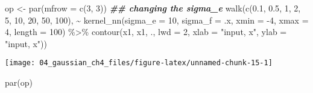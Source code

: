 \documentclass[
]{article}
\newenvironment{Shaded}{\begin{snugshade}}{\end{snugshade}}
\newcommand{\AttributeTok}[1]{\textcolor[rgb]{0.77,0.63,0.00}{#1}}
\newcommand{\DecValTok}[1]{\textcolor[rgb]{0.00,0.00,0.81}{#1}}
\newcommand{\DocumentationTok}[1]{\textcolor[rgb]{0.56,0.35,0.01}{\textbf{\textit{#1}}}}
\newcommand{\FloatTok}[1]{\textcolor[rgb]{0.00,0.00,0.81}{#1}}
\newcommand{\FunctionTok}[1]{\textcolor[rgb]{0.00,0.00,0.00}{#1}}
\newcommand{\NormalTok}[1]{#1}
\newcommand{\OtherTok}[1]{\textcolor[rgb]{0.56,0.35,0.01}{#1}}
\newcommand{\SpecialCharTok}[1]{\textcolor[rgb]{0.00,0.00,0.00}{#1}}
\newcommand{\StringTok}[1]{\textcolor[rgb]{0.31,0.60,0.02}{#1}}
\begin{document}
\begin{Shaded}
\begin{Highlighting}[]
\NormalTok{op }\OtherTok{\textless{}{-}} \FunctionTok{par}\NormalTok{(}\AttributeTok{mfrow =} \FunctionTok{c}\NormalTok{(}\DecValTok{3}\NormalTok{, }\DecValTok{3}\NormalTok{))}
\DocumentationTok{\#\# changing the sigma\_e}
\FunctionTok{walk}\NormalTok{(}\FunctionTok{c}\NormalTok{(}\FloatTok{0.1}\NormalTok{, }\FloatTok{0.5}\NormalTok{, }\DecValTok{1}\NormalTok{, }
      \DecValTok{2}\NormalTok{, }\DecValTok{5}\NormalTok{, }\DecValTok{10}\NormalTok{, }
      \DecValTok{20}\NormalTok{, }\DecValTok{50}\NormalTok{, }\DecValTok{100}\NormalTok{),}
    \SpecialCharTok{\textasciitilde{}} \FunctionTok{kernel\_nn}\NormalTok{(}\AttributeTok{sigma\_e =} \DecValTok{10}\NormalTok{,}
                \AttributeTok{sigma\_f =}\NormalTok{ .x,}
                \AttributeTok{xmin =} \SpecialCharTok{{-}}\DecValTok{4}\NormalTok{,}
                \AttributeTok{xmax =} \DecValTok{4}\NormalTok{,}
                \AttributeTok{length =} \DecValTok{100}\NormalTok{) }\SpecialCharTok{\%\textgreater{}\%}
      \FunctionTok{contour}\NormalTok{(x1, x1, .,}
              \AttributeTok{lwd =} \DecValTok{2}\NormalTok{,}
              \AttributeTok{xlab =} \StringTok{"input, x"}\NormalTok{,}
              \AttributeTok{ylab =} \StringTok{"input, x\textquotesingle{}"}\NormalTok{))}
\end{Highlighting}
\end{Shaded}

\begin{center}\texttt{[image: 04\_gaussian\_ch4\_files/figure-latex/unnamed-chunk-15-1]} \end{center}

\begin{Shaded}
\begin{Highlighting}[]
\FunctionTok{par}\NormalTok{(op)}
\end{Highlighting}
\end{Shaded}
\end{document}
